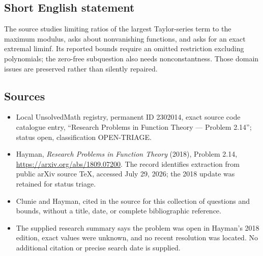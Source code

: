 \documentclass[11pt]{article}
\begin{document}
\subsection{Short English statement}
The source studies limiting ratios of the largest Taylor-series term to the maximum modulus, asks about nonvanishing functions, and asks for an exact extremal liminf. Its reported bounds require an omitted restriction excluding polynomials; the zero-free subquestion also needs nonconstantness. Those domain issues are preserved rather than silently repaired.
\subsection{Sources}
\begin{itemize}
\item Local UnsolvedMath registry, permanent ID 2302014, exact source code catalogue entry, ``Research Problems in Function Theory --- Problem 2.14''; status open, classification OPEN-TRIAGE.
\item Hayman, \emph{Research Problems in Function Theory} (2018), Problem 2.14, \url{https://arxiv.org/abs/1809.07200}. The record identifies extraction from public arXiv source TeX, accessed July 29, 2026; the 2018 update was retained for status triage.
\item Clunie and Hayman, cited in the source for this collection of questions and bounds, without a title, date, or complete bibliographic reference.
\item The supplied research summary says the problem was open in Hayman's 2018 edition, exact values were unknown, and no recent resolution was located. No additional citation or precise search date is supplied.
\end{itemize}
\end{document}
